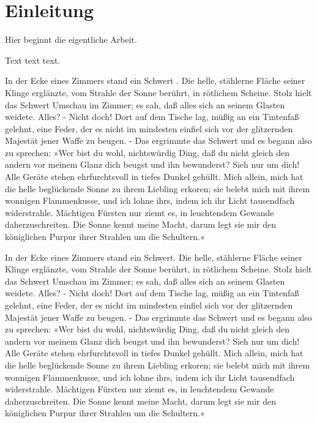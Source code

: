 \chapter{Einleitung}\label{einleitung}
Hier beginnt die eigentliche Arbeit.

Text text text.

In der Ecke eines Zimmers stand ein Schwert \cite{btt:1998}. Die helle, stählerne Fläche seiner
Klinge erglänzte, vom Strahle der Sonne berührt, in rötlichem Scheine. Stolz
hielt das Schwert Umschau im Zimmer; es sah, daß alles sich an seinem Glasten
weidete. Alles? - Nicht doch! Dort auf dem Tische lag, müßig an ein Tintenfaß
gelehnt, eine Feder, der es nicht im mindesten einfiel sich vor der
glitzernden Majestät jener Waffe zu beugen. - Das ergrimmte das Schwert und es
begann also zu sprechen: »Wer bist du wohl, nichtswürdig Ding, daß du nicht
gleich den andern vor meinem Glanz dich beugst und ihn bewunderst? Sieh nur
um dich! Alle Geräte stehen ehrfurchtsvoll in tiefes Dunkel gehüllt. Mich
allein, mich hat die helle beglückende Sonne zu ihrem Liebling erkoren; sie
belebt mich mit ihrem wonnigen Flammenkusse, und ich lohne ihrs, indem ich ihr
Licht tausendfach widerstrahle. Mächtigen Fürsten nur ziemt es, in leuchtendem
Gewande daherzuschreiten. Die Sonne kennt meine Macht, darum legt sie mir den
königlichen Purpur ihrer Strahlen um die Schultern.«

In der Ecke eines Zimmers stand ein Schwert. Die helle, stählerne Fläche seiner
Klinge erglänzte, vom Strahle der Sonne berührt, in rötlichem Scheine. Stolz
hielt das Schwert Umschau im Zimmer; es sah, daß alles sich an seinem Glasten
weidete. Alles? - Nicht doch! Dort auf dem Tische lag, müßig an ein Tintenfaß
gelehnt, eine Feder, der es nicht im mindesten einfiel sich vor der
glitzernden Majestät jener Waffe zu beugen. - Das ergrimmte das Schwert und es
begann also zu sprechen: »Wer bist du wohl, nichtswürdig Ding, daß du nicht
gleich den andern vor meinem Glanz dich beugst und ihn bewunderst? Sieh nur
um dich! Alle Geräte stehen ehrfurchtsvoll in tiefes Dunkel gehüllt. Mich
allein, mich hat die helle beglückende Sonne zu ihrem Liebling erkoren; sie
belebt mich mit ihrem wonnigen Flammenkusse, und ich lohne ihrs, indem ich ihr
Licht tausendfach widerstrahle. Mächtigen Fürsten nur ziemt es, in leuchtendem
Gewande daherzuschreiten. Die Sonne kennt meine Macht, darum legt sie mir den
königlichen Purpur ihrer Strahlen um die Schultern.«

